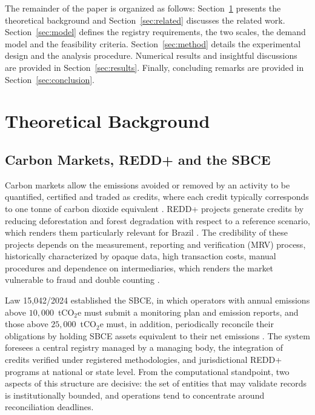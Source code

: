 \documentclass[english]{sbc2025}%
\begin{document}
The remainder of the paper is organized as follows: Section~\ref{sec:background} presents the theoretical background and Section~\ref{sec:related} discusses the related work. Section~\ref{sec:model} defines the registry requirements, the two scales, the demand model and the feasibility criteria. Section~\ref{sec:method} details the experimental design and the analysis procedure. Numerical results and insightful discussions are provided in Section~\ref{sec:results}. Finally, concluding remarks are provided in Section~\ref{sec:conclusion}.

\section{Theoretical Background}
\label{sec:background}

\subsection{Carbon Markets, REDD+ and the SBCE}

Carbon markets allow the emissions avoided or removed by an activity to be quantified, certified and traded as credits, where each credit typically corresponds to one tonne of carbon dioxide equivalent \citep{Aguiar2018}. REDD+ projects generate credits by reducing deforestation and forest degradation with respect to a reference scenario, which renders them particularly relevant for Brazil \citep{Aguiar2018,Neves2025}. The credibility of these projects depends on the measurement, reporting and verification (MRV) process, historically characterized by opaque data, high transaction costs, manual procedures and dependence on intermediaries, which renders the market vulnerable to fraud and double counting \citep{Kotsialou2022,Howson2019geoforum,Caburlao2026fsi}.

Law 15,042/2024 established the SBCE, in which operators with annual emissions above $10{,}000$~tCO$_2$e must submit a monitoring plan and emission reports, and those above $25{,}000$~tCO$_2$e must, in addition, periodically reconcile their obligations by holding SBCE assets equivalent to their net emissions \citep{Lei15042}. The system foresees a central registry managed by a managing body, the integration of credits verified under registered methodologies, and jurisdictional REDD+ programs at national or state level. From the computational standpoint, two aspects of this structure are decisive: the set of entities that may validate records is institutionally bounded, and operations tend to concentrate around reconciliation deadlines.
\end{document}
